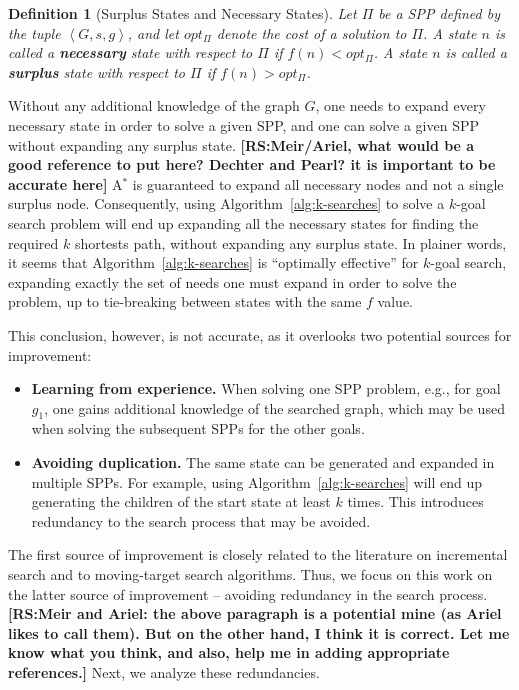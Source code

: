 \documentclass{aicom2e}
\newtheorem{definition}{Definition}
\newcommand{\kgs}{$k$-goal search}
\newcommand{\astar}{A$^*$}
\newcommand{\tuple}[1]{\ensuremath{\left \langle #1 \right \rangle }}
\newcommand{\roni}[1]{\textbf{[RS:#1]}}
\begin{document}
\begin{definition}[Surplus States and Necessary States]
	Let $\Pi$ be a SPP defined by the tuple $\tuple{G,s,g}$, and let $opt_\Pi$ denote the cost of a solution to $\Pi$. 
	A state $n$ is called a {\bf necessary} state with respect to $\Pi$ if $f(n)<opt_\Pi$. 
	A state $n$ is called a {\bf surplus} state with respect to $\Pi$ if $f(n)>opt_\Pi$. 
\end{definition}
Without any additional knowledge of the graph $G$, one needs to expand every necessary state in order to solve a given SPP, 
and one can solve a given SPP without expanding any surplus state. \roni{Meir/Ariel, what would be a good reference to put here? Dechter and Pearl? it is important to be accurate here}
\astar{} is guaranteed to expand all necessary nodes and not a single surplus node. Consequently, 
using Algorithm~\ref{alg:k-searches} to solve a \kgs{} problem will end up expanding all the necessary states 
for finding the required $k$ shortests path, without expanding any surplus state. 
In plainer words, it seems that Algorithm~\ref{alg:k-searches} is ``optimally effective'' for \kgs{}, 
expanding exactly the set of needs one must expand in order to solve the problem, up to tie-breaking between states with the same $f$ value. 


This conclusion, however, is not accurate, as it overlooks two potential sources for improvement:
\begin{itemize}
	\item {\bf Learning from experience.} When solving one SPP problem, e.g., for goal $g_1$, one gains additional knowledge of the searched graph, which may be used when solving the subsequent SPPs for the other goals.
	\item {\bf Avoiding duplication.} The same state can be generated and expanded in multiple SPPs. For example, using Algorithm~\ref{alg:k-searches} will end up generating the children of the start state at least $k$ times. This introduces redundancy to the search process that may be avoided.  
\end{itemize}
The first source of improvement is closely related to the literature on incremental search and to moving-target search algorithms. Thus, we focus on this work on the latter source of improvement -- avoiding redundancy in the search process. 
\roni{Meir and Ariel: the above paragraph is a potential mine (as Ariel likes to call them). But on the other hand, I think it is correct. Let me know what you think, and also, help me in adding appropriate references.}
Next, we analyze these redundancies. 
\end{document}
